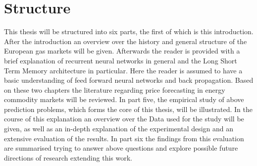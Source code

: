\section{Structure}
This thesis will be structured into six parts, the first of which is this introduction. After the introduction an overview over the history and general structure of the European gas markets will be given. Afterwards the reader is provided with a brief explanation of recurrent neural networks in general and the Long Short Term Memory architecture in particular. Here the reader is assumed to have a basic understanding of feed forward neural networks and back propagation. Based on these two chapters  the literature regarding price forecasting in energy commodity markets will be reviewed. In part five, the empirical study of above prediction problems, which forms the core of this thesis, will be illustrated. In the course of this explanation an overview over the Data used for the study will be given, as well as an in-depth explanation of the experimental design and an extensive evaluation of the results. In part six the findings from this evaluation are summarised trying to answer above questions and explore possible future directions of research extending this work. 